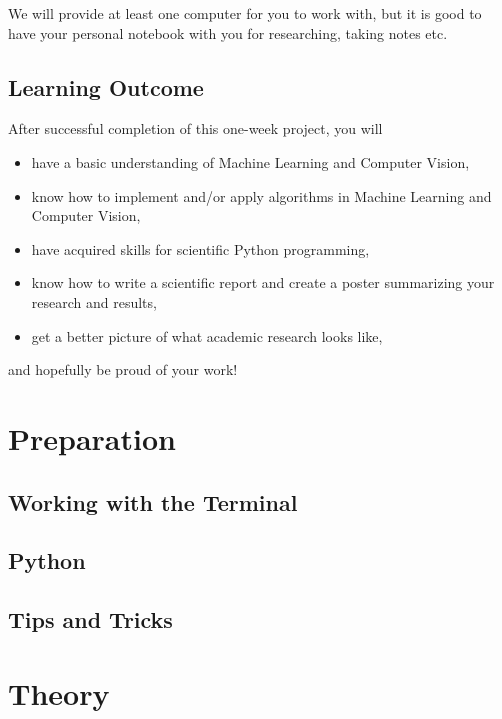 \documentclass[a4paper]{article}
\begin{document}
		We will provide at least one computer for you to work with, but it is good to have your personal notebook with you for researching, taking notes etc.
	
	\subsection{Learning Outcome}
		After successful completion of this one-week project, you will  %
		\begin{itemize}
			\item have a basic understanding of Machine Learning and Computer Vision,
			\item know how to implement and/or apply algorithms in Machine Learning and Computer Vision,
			\item have acquired skills for scientific Python programming,
			\item know how to write a scientific report and create a poster summarizing your research and results,
			\item get a better picture of what academic research looks like,
		\end{itemize}
		and hopefully be proud of your work!
	

\section{Preparation}
	\subsection{Working with the Terminal}
	
	\subsection{Python}
	
	\subsection{Tips and Tricks}
	
	
\section{Theory}
\end{document}
